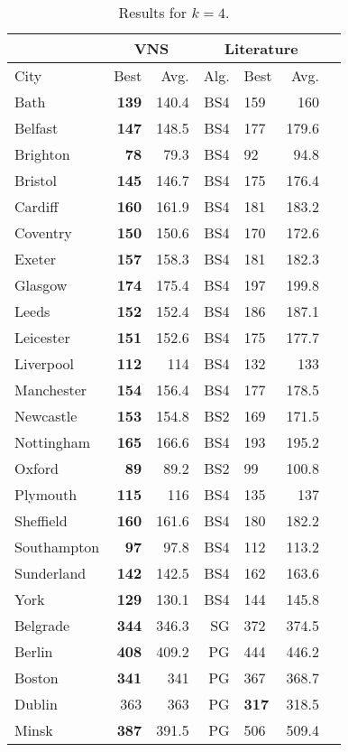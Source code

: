 \documentclass[dvipsnames,format=sigconf,anonymous=true,review=true]{acmart}
\begin{document}
\begin{table}
	\caption{Results for $k=4$.}
	\label{tab:k4}  
	\begin{tabular}{l|rr|rlrr}
		\hline
		\multicolumn{1}{c}{ } & \multicolumn{2}{|c}{VNS} & \multicolumn{3}{|c}{Literature} \\
		\hline
		City & Best & Avg. & Alg. & Best & Avg. \\ \hline
		Bath&\bf{139}&140.4&BS4&159&160\\
		Belfast&\bf{147}&148.5&BS4&177&179.6\\
		Brighton&\bf{78}&79.3&BS4&92&94.8\\
		Bristol&\bf{145}&146.7&BS4&175&176.4\\
		Cardiff&\bf{160}&161.9&BS4&181&183.2\\
		Coventry&\bf{150}&150.6&BS4&170&172.6\\
		Exeter&\bf{157}&158.3&BS4&181&182.3\\
		Glasgow&\bf{174}&175.4&BS4&197&199.8\\
		Leeds&\bf{152}&152.4&BS4&186&187.1\\
		Leicester&\bf{151}&152.6&BS4&175&177.7\\
		Liverpool&\bf{112}&114&BS4&132&133\\
		Manchester&\bf{154}&156.4&BS4&177&178.5\\
		Newcastle&\bf{153}&154.8&BS2&169&171.5\\
		Nottingham&\bf{165}&166.6&BS4&193&195.2\\
		Oxford&\bf{89}&89.2&BS2&99&100.8\\
		Plymouth&\bf{115}&116&BS4&135&137\\
		Sheffield&\bf{160}&161.6&BS4&180&182.2\\
		Southampton&\bf{97}&97.8&BS4&112&113.2\\
		Sunderland&\bf{142}&142.5&BS4&162&163.6\\
		York&\bf{129}&130.1&BS4&144&145.8\\  \hline  \hline
		Belgrade&\bf{344}&346.3&SG&372&374.5\\
		Berlin&\bf{408}&409.2&PG&444&446.2\\
		Boston&\bf{341}&341&PG&367&368.7\\
		Dublin&363&363&PG&\bf{317}&318.5\\
		Minsk&\bf{387}&391.5&PG&506&509.4\\
		\hline
		
	\end{tabular}
\end{table}
\end{document}
